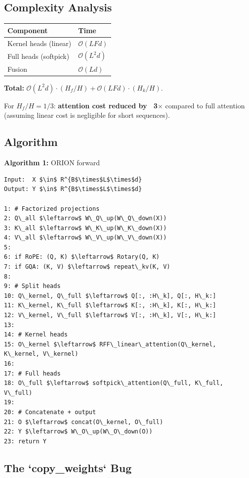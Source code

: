 \subsection{Complexity Analysis}

\begin{table}[H]
\centering
\small
\begin{tabular}{ll}
\toprule
\textbf{Component} & \textbf{Time} \\
\midrule
Kernel heads (linear) & $\mathcal{O}(L F d)$ \\
Full heads (softpick) & $\mathcal{O}(L^2 d)$ \\
Fusion & $\mathcal{O}(L d)$ \\
\bottomrule
\end{tabular}
\end{table}

\textbf{Total:} $\mathcal{O}(L^2 d) \cdot (H_f / H) + \mathcal{O}(L F d) \cdot (H_k / H)$.

For $H_f / H = 1/3$: \textbf{attention cost reduced by ~3$\times$} compared to full 
attention (assuming linear cost is negligible for short sequences).

\subsection{Algorithm}

\textbf{Algorithm 1:} ORION forward
\begin{lstlisting}
Input:  X $\in$ R^{B$\times$L$\times$d}
Output: Y $\in$ R^{B$\times$L$\times$d}

1: # Factorized projections
2: Q\_all $\leftarrow$ W\_Q\_up(W\_Q\_down(X))
3: K\_all $\leftarrow$ W\_K\_up(W\_K\_down(X))
4: V\_all $\leftarrow$ W\_V\_up(W\_V\_down(X))
5:
6: if RoPE: (Q, K) $\leftarrow$ Rotary(Q, K)
7: if GQA: (K, V) $\leftarrow$ repeat\_kv(K, V)
8:
9: # Split heads
10: Q\_kernel, Q\_full $\leftarrow$ Q[:, :H\_k], Q[:, H\_k:]
11: K\_kernel, K\_full $\leftarrow$ K[:, :H\_k], K[:, H\_k:]
12: V\_kernel, V\_full $\leftarrow$ V[:, :H\_k], V[:, H\_k:]
13:
14: # Kernel heads
15: O\_kernel $\leftarrow$ RFF\_linear\_attention(Q\_kernel, K\_kernel, V\_kernel)
16:
17: # Full heads
18: O\_full $\leftarrow$ softpick\_attention(Q\_full, K\_full, V\_full)
19:
20: # Concatenate + output
21: O $\leftarrow$ concat(O\_kernel, O\_full)
22: Y $\leftarrow$ W\_O\_up(W\_O\_down(O))
23: return Y
\end{lstlisting}

\subsection{The `copy\_weights` Bug}

